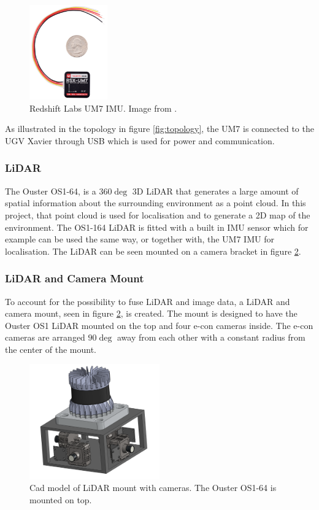 \begin{figure}[H]
  \centering
  \includegraphics[width = 0.3\textwidth]{Figures/um7_imu.png}
  \caption{Redshift Labs UM7 IMU. Image from \cite{um7_imu}.}
  \label{fig:um7_imu}
\end{figure}

As illustrated in the topology in figure \ref{fig:topology}, the UM7 is connected to the UGV Xavier through USB which is used for power and communication.

\subsubsection{LiDAR}
The Ouster OS1-64, is a $360\deg$ 3D LiDAR that generates a large amount of spatial information about the surrounding environment as a point cloud. In this project, that point cloud is used for localisation and to generate a 2D map of the environment. The OS1-164 LiDAR is fitted with a built in IMU sensor which for example can be used the same way, or together with, the UM7 IMU for localisation. The LiDAR can be seen mounted on a camera bracket in figure \ref{fig:lidar_mount}.

\subsubsection{LiDAR and Camera Mount}
To account for the possibility to fuse LiDAR and image data, a LiDAR and camera mount, seen in figure \ref{fig:lidar_mount}, is created. The mount is designed to have the Ouster OS1 LiDAR mounted on the top and four e-con cameras inside. The e-con cameras are arranged $90\deg$ away from each other with a constant radius from the center of the mount.

\begin{figure}[H]
  \centering
  \includegraphics[width = 0.5\textwidth]{Figures/lidar_mount.png}
  \caption{Cad model of LiDAR mount with cameras. The Ouster OS1-64 is mounted on top.}
  \label{fig:lidar_mount}
\end{figure}

